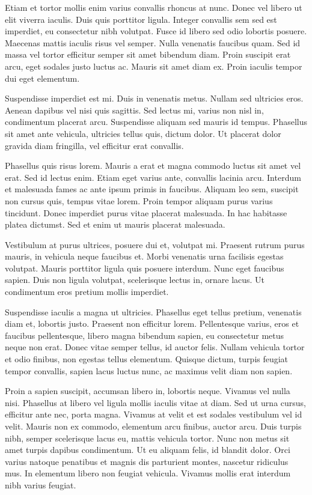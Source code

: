 \documentclass[10pt,twoside,slovak,a4paper]{article}
\begin{document}
Etiam et tortor mollis enim varius convallis rhoncus at nunc. Donec vel libero ut elit viverra iaculis. Duis quis porttitor ligula. Integer convallis sem sed est imperdiet, eu consectetur nibh volutpat. Fusce id libero sed odio lobortis posuere. Maecenas mattis iaculis risus vel semper. Nulla venenatis faucibus quam. Sed id massa vel tortor efficitur semper sit amet bibendum diam. Proin suscipit erat arcu, eget sodales justo luctus ac. Mauris sit amet diam ex. Proin iaculis tempor dui eget elementum.

Suspendisse imperdiet est mi. Duis in venenatis metus. Nullam sed ultricies eros. Aenean dapibus vel nisi quis sagittis. Sed lectus mi, varius non nisl in, condimentum placerat arcu. Suspendisse aliquam sed mauris id tempus. Phasellus sit amet ante vehicula, ultricies tellus quis, dictum dolor. Ut placerat dolor gravida diam fringilla, vel efficitur erat convallis.

Phasellus quis risus lorem. Mauris a erat et magna commodo luctus sit amet vel erat. Sed id lectus enim. Etiam eget varius ante, convallis lacinia arcu. Interdum et malesuada fames ac ante ipsum primis in faucibus. Aliquam leo sem, suscipit non cursus quis, tempus vitae lorem. Proin tempor aliquam purus varius tincidunt. Donec imperdiet purus vitae placerat malesuada. In hac habitasse platea dictumst. Sed et enim ut mauris placerat malesuada.

Vestibulum at purus ultrices, posuere dui et, volutpat mi. Praesent rutrum purus mauris, in vehicula neque faucibus et. Morbi venenatis urna facilisis egestas volutpat. Mauris porttitor ligula quis posuere interdum. Nunc eget faucibus sapien. Duis non ligula volutpat, scelerisque lectus in, ornare lacus. Ut condimentum eros pretium mollis imperdiet.

Suspendisse iaculis a magna ut ultricies. Phasellus eget tellus pretium, venenatis diam et, lobortis justo. Praesent non efficitur lorem. Pellentesque varius, eros et faucibus pellentesque, libero magna bibendum sapien, eu consectetur metus neque non erat. Donec vitae semper tellus, id auctor felis. Nullam vehicula tortor et odio finibus, non egestas tellus elementum. Quisque dictum, turpis feugiat tempor convallis, sapien lacus luctus nunc, ac maximus velit diam non sapien.

Proin a sapien suscipit, accumsan libero in, lobortis neque. Vivamus vel nulla nisi. Phasellus at libero vel ligula mollis iaculis vitae at diam. Sed ut urna cursus, efficitur ante nec, porta magna. Vivamus at velit et est sodales vestibulum vel id velit. Mauris non ex commodo, elementum arcu finibus, auctor arcu. Duis turpis nibh, semper scelerisque lacus eu, mattis vehicula tortor. Nunc non metus sit amet turpis dapibus condimentum. Ut eu aliquam felis, id blandit dolor. Orci varius natoque penatibus et magnis dis parturient montes, nascetur ridiculus mus. In elementum libero non feugiat vehicula. Vivamus mollis erat interdum nibh varius feugiat.
\end{document}

